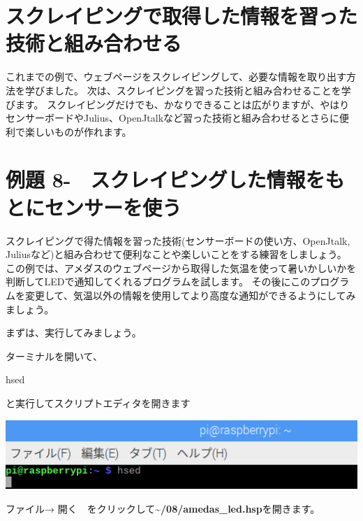 \documentclass[a4paper,12pt,dvipdfmx]{jarticle}
\newcounter{Exercise}
\renewcommand\theExercise{例題 8-\arabic{Exercise}}
\begin{document}
\bigskip

\clearpage\section{スクレイピングで取得した情報を習った技術と組み合わせる}
これまでの例で、ウェブページをスクレイピングして、必要な情報を取り出す方法を学びました。
次は、スクレイピングを習った技術と組み合わせることを学びます。
スクレイピングだけでも、かなりできることは広がりますが、やはりセンサーボードやJulius、OpenJtalkなど習った技術と組み合わせるとさらに便利で楽しいものが作れます。

\clearpage\section{\theExercise　スクレイピングした情報をもとにセンサーを使う}
スクレイピングで得た情報を習った技術(センサーボードの使い方、OpenJtalk,
Juliusなど)と組み合わせて便利なことや楽しいことをする練習をしましょう。
この例では、アメダスのウェブページから取得した気温を使って暑いかしいかを判断してLEDで通知してくれるプログラムを試します。
その後にこのプログラムを変更して、気温以外の情報を使用してより高度な通知ができるようにしてみましょう。

まずは、実行してみましょう。

ターミナルを開いて、

hsed

と実行してスクリプトエディタを開きます

\begin{center}
\includegraphics[width=17.057cm]{textbook-img013.png}

\end{center}
ファイル→
開く　をクリックして\textbf{{\textasciitilde}/08/amedas\_led.hsp}を開きます。
\end{document}
